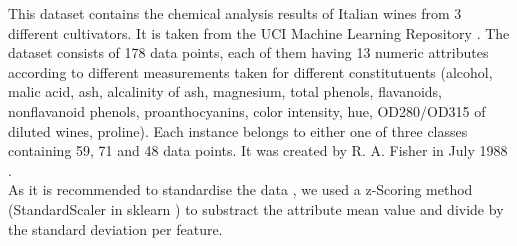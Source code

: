 \marginnote{\textcolor{blue}{Jonas Elpelt}}
This dataset contains the chemical analysis results of Italian wines from 3 different cultivators. It is taken from the UCI Machine Learning Repository \cite{Dua2019}. 
The dataset consists of 178 data points, each of them having 13 numeric attributes according to different measurements taken for different constitutuents (alcohol, malic acid, ash, alcalinity of ash, magnesium, total phenols, flavanoids, nonflavanoid phenols, proanthocyanins, color intensity, hue, OD280/OD315 of diluted wines, proline). Each instance belongs to either one of three classes containing 59, 71 and 48 data points. 
It was created by R. A. Fisher in July 1988 \cite{scikitlearn}.\\ 
As it is recommended to standardise the data \cite{Dua2019}, we used a z-Scoring method (StandardScaler in sklearn \cite{scikitlearn}) to substract the attribute mean value and divide by the standard deviation per feature. 